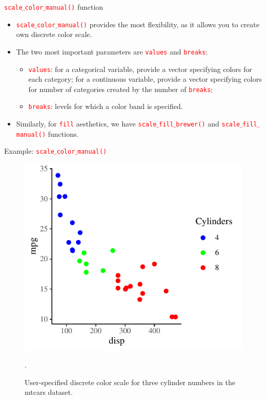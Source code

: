 \documentclass{beamer}
\begin{document}
\begin{frame}{\texttt{\textcolor{red}{scale$\_$color$\_$manual()}} function}
\begin{itemize}
\item \texttt{\textcolor{red}{scale$\_$color$\_$manual()}} provides the most flexibility, as it allows you to create own discrete color scale.
\vspace{0.25in}
\item<2-> The two most important parameters are \texttt{\textcolor{red}{values}} and \texttt{\textcolor{red}{breaks}}:
\begin{itemize}
\item \texttt{\textcolor{red}{values}}: for a categorical variable, provide a vector specifying colors for each category; for a continuous variable, provide a vector specifying colors for number of categories created by the number of \texttt{\textcolor{red}{breaks}};
\item \texttt{\textcolor{red}{breaks}}: levels for which a color band is specified.
\end{itemize}
\vspace{0.25in}

\item<3-> Similarly, for \texttt{\textcolor{red}{fill}} aesthetics, we have \texttt{\textcolor{red}{scale$\_$fill$\_$brewer()}} and 
\texttt{\textcolor{red}{scale$\_$fill$\_$manual()}} functions.
\end{itemize}
\end{frame}

\begin{frame}{Example: \texttt{\textcolor{red}{scale$\_$color$\_$manual()}}}
\begin{figure}
\includegraphics[width=0.80\linewidth]{PlotsLec3/ColorManual}
\caption{\small{User-specified discrete color scale for three cylinder numbers in the mtcars dataset}.}.
\end{figure}
\end{frame}
\end{document}
